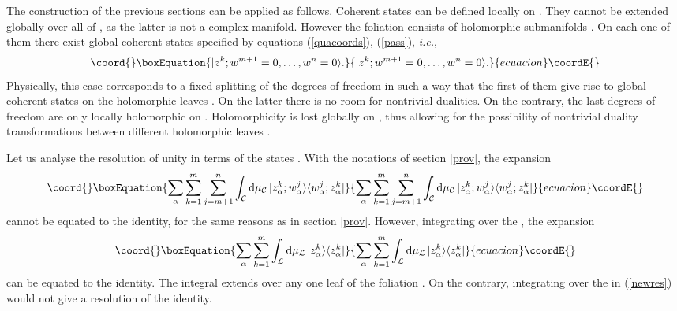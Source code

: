 \documentclass[a4paper,a4paper]{article}
\begin{document}
The construction of the previous sections can be applied as follows. 
Coherent states \coordHE{} can be defined locally on 
\coordHE{}. They cannot be extended globally over all of \coordHE{}, 
as the latter is not a complex manifold. However the foliation \coordHE{} 
consists of holomorphic submanifolds \coordHE{}. On each one of them there 
exist global coherent states specified by equations 
(\ref{quacoords}), (\ref{pass}), {\it i.e.}, 
\begin{equation}\coord{}\boxEquation{
|z^k;w^{m+1}=0,\ldots, w^n = 0\rangle.
\label{speci}
}{
|z^k;w^{m+1}=0,\ldots, w^n = 0\rangle.
}{ecuacion}\coordE{}\end{equation}
Physically, this case corresponds to a fixed splitting of the \coordHE{} degrees 
of freedom in such a way that the first \coordHE{} of them give rise to global coherent 
states on the holomorphic leaves \coordHE{}. On the latter there is no room 
for nontrivial dualities. On the contrary, the last \coordHE{} degrees of freedom
are only locally holomorphic on \coordHE{}. Holomorphicity is lost 
globally on \coordHE{}, thus allowing for the possibility of nontrivial 
duality transformations between different holomorphic leaves \coordHE{}. 

Let us analyse the resolution of unity in terms of the states
\coordHE{}. With the notations of section \ref{prov}, the expansion
\begin{equation}\coord{}\boxEquation{
\sum_{\alpha}\sum_{k=1}^m\sum_{j=m+1}^n\int_{\cal C} {\rm d}\mu_{\cal C}\, 
|z^k_{\alpha};w^j_{\alpha}\rangle  \langle w^j_{\alpha};z^k_{\alpha}|
\label{newres}
}{
\sum_{\alpha}\sum_{k=1}^m\sum_{j=m+1}^n\int_{\cal C} {\rm d}\mu_{\cal C}\, 
|z^k_{\alpha};w^j_{\alpha}\rangle  \langle w^j_{\alpha};z^k_{\alpha}|
}{ecuacion}\coordE{}\end{equation}
cannot be equated to the identity,
for the same reasons as in section \ref{prov}.
However, integrating over the \coordHE{}, the expansion
\begin{equation}\coord{}\boxEquation{
\sum_{\alpha}\sum_{k=1}^m\int_{\cal L} {\rm d}\mu_{\cal L}\, 
|z^k_{\alpha}\rangle  \langle z^k_{\alpha}|
\label{newresx}
}{
\sum_{\alpha}\sum_{k=1}^m\int_{\cal L} {\rm d}\mu_{\cal L}\, 
|z^k_{\alpha}\rangle  \langle z^k_{\alpha}|
}{ecuacion}\coordE{}\end{equation}
can be equated to the identity. The integral extends over any one leaf \coordHE{} 
of the foliation \coordHE{}. On the contrary, integrating over the \coordHE{} 
in (\ref{newres}) would not give a resolution of the identity.
\end{document}
